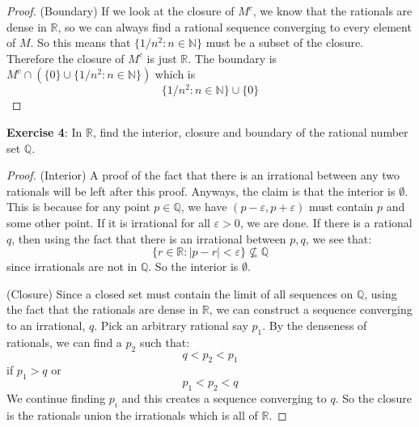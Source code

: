 \documentclass{article}
\begin{document}
\begin{proof}
        (Boundary) If we look at the closure of $M^{c}$, we know that the rationals are dense in $\mathbb{R}$, so we can always find a rational sequence converging to every element of $M$. So this means that $\{1/n^{2} : n \in \mathbb{N}\}$ must be a subset of the closure. Therefore the closure of $M^{c}$ is just $\mathbb{R}$. The boundary is $M^{c} \cap (\{0\} \cup \{1/n^{2} : n \in \mathbb{N}\})$ which is 
            \begin{equation*}
                \{1/n^{2} : n \in \mathbb{N}\} \cup \{0\}
            \end{equation*}
    \end{proof}

\textbf{Exercise 4}: In $\mathbb{R}$, find the interior, closure and boundary of the rational number set $\mathbb{Q}$.
    \begin{proof}
        (Interior) A proof of the fact that there is an irrational between any two rationals will be left after this proof. Anyways, the claim is that the interior is $\emptyset$. This is because for any point $p \in \mathbb{Q}$, we have $(p - \varepsilon, p + \varepsilon)$ must contain $p$ and some other point. If it is irrational for all $\varepsilon > 0$, we are done. If there is a rational $q$, then using the fact that there is an irrational between $p, q$, we see that:
            \begin{equation*}
                \{r \in \mathbb{R} : \lvert p - r \rvert < \varepsilon\} \not\subseteq \mathbb{Q}
            \end{equation*}
        since irrationals are not in $\mathbb{Q}$. So the interior is $\emptyset$.

        (Closure) Since a closed set must contain the limit of all sequences on $\mathbb{Q}$, using the fact that the rationals are dense in $\mathbb{R}$, we can construct a sequence converging to an irrational, $q$. Pick an arbitrary rational say $p_{1}$. By the denseness of rationals, we can find a $p_{2}$ such that:
            \begin{equation*}
                q < p_{2} < p_{1}
            \end{equation*}
        if $p_{1} > q$ or 
            \begin{equation*}
                p_{1} < p_{2} < q
            \end{equation*}
        We continue finding $p_{i}$ and this creates a sequence converging to $q$. So the closure is the rationals union the irrationals which is all of $\mathbb{R}$.


\end{proof}
\end{document}
